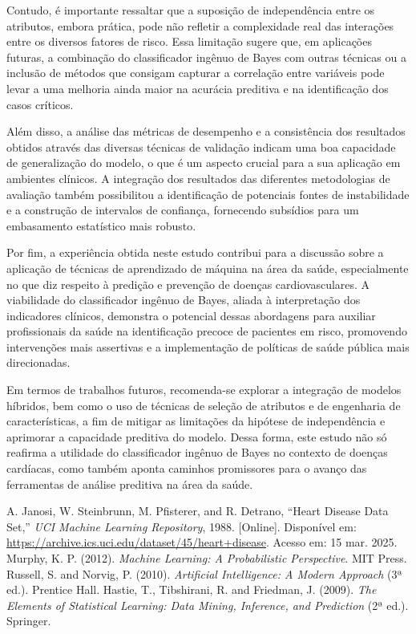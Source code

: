 \documentclass[conference]{IEEEtran}
\begin{document}
Contudo, é importante ressaltar que a suposição de independência entre os atributos, embora prática, pode não refletir a complexidade real das interações entre os diversos fatores de risco. Essa limitação sugere que, em aplicações futuras, a combinação do classificador ingênuo de Bayes com outras técnicas ou a inclusão de métodos que consigam capturar a correlação entre variáveis pode levar a uma melhoria ainda maior na acurácia preditiva e na identificação dos casos críticos.

Além disso, a análise das métricas de desempenho e a consistência dos resultados obtidos através das diversas técnicas de validação indicam uma boa capacidade de generalização do modelo, o que é um aspecto crucial para a sua aplicação em ambientes clínicos. A integração dos resultados das diferentes metodologias de avaliação também possibilitou a identificação de potenciais fontes de instabilidade e a construção de intervalos de confiança, fornecendo subsídios para um embasamento estatístico mais robusto.

Por fim, a experiência obtida neste estudo contribui para a discussão sobre a aplicação de técnicas de aprendizado de máquina na área da saúde, especialmente no que diz respeito à predição e prevenção de doenças cardiovasculares. A viabilidade do classificador ingênuo de Bayes, aliada à interpretação dos indicadores clínicos, demonstra o potencial dessas abordagens para auxiliar profissionais da saúde na identificação precoce de pacientes em risco, promovendo intervenções mais assertivas e a implementação de políticas de saúde pública mais direcionadas.

Em termos de trabalhos futuros, recomenda-se explorar a integração de modelos híbridos, bem como o uso de técnicas de seleção de atributos e de engenharia de características, a fim de mitigar as limitações da hipótese de independência e aprimorar a capacidade preditiva do modelo. Dessa forma, este estudo não só reafirma a utilidade do classificador ingênuo de Bayes no contexto de doenças cardíacas, como também aponta caminhos promissores para o avanço das ferramentas de análise preditiva na área da saúde.

\begin{thebibliography}{00}
     A. Janosi, W. Steinbrunn, M. Pfisterer, and R. Detrano, ``Heart Disease Data Set,'' \textit{UCI Machine Learning Repository}, 1988. [Online]. Disponível em: \url{https://archive.ics.uci.edu/dataset/45/heart+disease}. Acesso em: 15 mar. 2025.
    Murphy, K. P. (2012). \textit{Machine Learning: A Probabilistic Perspective}. MIT Press.
    Russell, S. and Norvig, P. (2010). \textit{Artificial Intelligence: A Modern Approach} (3ª ed.). Prentice Hall.
    Hastie, T., Tibshirani, R. and Friedman, J. (2009). \textit{The Elements of Statistical Learning: Data Mining, Inference, and Prediction} (2ª ed.). Springer.
\end{thebibliography}
\end{document}
